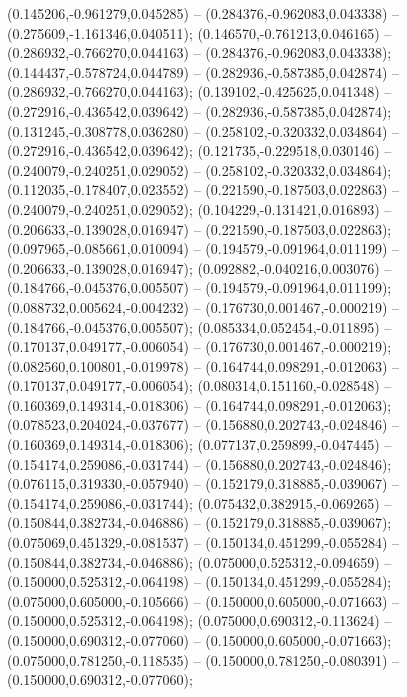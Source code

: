  (0.145206,-0.961279,0.045285) -- (0.284376,-0.962083,0.043338) -- (0.275609,-1.161346,0.040511);
 (0.146570,-0.761213,0.046165) -- (0.286932,-0.766270,0.044163) -- (0.284376,-0.962083,0.043338);
 (0.144437,-0.578724,0.044789) -- (0.282936,-0.587385,0.042874) -- (0.286932,-0.766270,0.044163);
 (0.139102,-0.425625,0.041348) -- (0.272916,-0.436542,0.039642) -- (0.282936,-0.587385,0.042874);
 (0.131245,-0.308778,0.036280) -- (0.258102,-0.320332,0.034864) -- (0.272916,-0.436542,0.039642);
 (0.121735,-0.229518,0.030146) -- (0.240079,-0.240251,0.029052) -- (0.258102,-0.320332,0.034864);
 (0.112035,-0.178407,0.023552) -- (0.221590,-0.187503,0.022863) -- (0.240079,-0.240251,0.029052);
 (0.104229,-0.131421,0.016893) -- (0.206633,-0.139028,0.016947) -- (0.221590,-0.187503,0.022863);
 (0.097965,-0.085661,0.010094) -- (0.194579,-0.091964,0.011199) -- (0.206633,-0.139028,0.016947);
 (0.092882,-0.040216,0.003076) -- (0.184766,-0.045376,0.005507) -- (0.194579,-0.091964,0.011199);
 (0.088732,0.005624,-0.004232) -- (0.176730,0.001467,-0.000219) -- (0.184766,-0.045376,0.005507);
 (0.085334,0.052454,-0.011895) -- (0.170137,0.049177,-0.006054) -- (0.176730,0.001467,-0.000219);
 (0.082560,0.100801,-0.019978) -- (0.164744,0.098291,-0.012063) -- (0.170137,0.049177,-0.006054);
 (0.080314,0.151160,-0.028548) -- (0.160369,0.149314,-0.018306) -- (0.164744,0.098291,-0.012063);
 (0.078523,0.204024,-0.037677) -- (0.156880,0.202743,-0.024846) -- (0.160369,0.149314,-0.018306);
 (0.077137,0.259899,-0.047445) -- (0.154174,0.259086,-0.031744) -- (0.156880,0.202743,-0.024846);
 (0.076115,0.319330,-0.057940) -- (0.152179,0.318885,-0.039067) -- (0.154174,0.259086,-0.031744);
 (0.075432,0.382915,-0.069265) -- (0.150844,0.382734,-0.046886) -- (0.152179,0.318885,-0.039067);
 (0.075069,0.451329,-0.081537) -- (0.150134,0.451299,-0.055284) -- (0.150844,0.382734,-0.046886);
 (0.075000,0.525312,-0.094659) -- (0.150000,0.525312,-0.064198) -- (0.150134,0.451299,-0.055284);
 (0.075000,0.605000,-0.105666) -- (0.150000,0.605000,-0.071663) -- (0.150000,0.525312,-0.064198);
 (0.075000,0.690312,-0.113624) -- (0.150000,0.690312,-0.077060) -- (0.150000,0.605000,-0.071663);
 (0.075000,0.781250,-0.118535) -- (0.150000,0.781250,-0.080391) -- (0.150000,0.690312,-0.077060);
